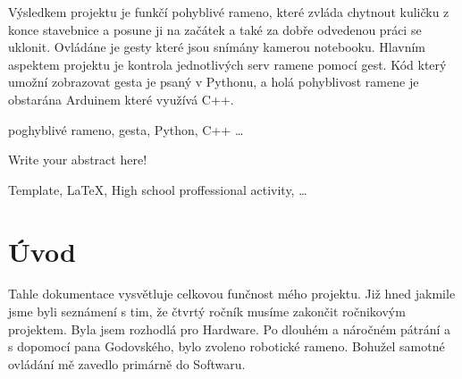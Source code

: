 \documentclass[12pt, a4paper,
twoside,        %
openright
]{report}
\begin{document}
{%

	\noindent 
	Výsledkem projektu je funkčí pohyblivé rameno, které zvláda chytnout kuličku z konce stavebnice a posune ji na začátek a také za dobře odvedenou práci se uklonit. Ovládáne je gesty které jsou snímány kamerou notebooku. Hlavním aspektem projektu je kontrola jednotlivých serv ramene pomocí gest. Kód který umožní zobrazovat  gesta je psaný v Pythonu, a holá pohyblivost ramene je obstarána Arduinem které využívá C++. 
	
	
	\vspace{18pt}
	
	
	\noindent poghyblivé rameno, gesta, Python, C++ \dots 
	
	\vspace{18pt}

	
	\noindent Write your abstract here! \lipsum[1] %
	
	\vspace{18pt}
	
	
	\noindent Template, \LaTeX, High school proffessional activity, \dots 
	
	\clearpage %

	
	\tableofcontents %

	\setcounter{page}{1} %

	\chapter*{Úvod}

	

Tahle dokumentace vysvětluje celkovou funčnost mého projektu. Již hned jakmile jsme byli seznámení s tim, že čtvrtý ročník musíme zakončit ročnikovým projektem. Byla jsem rozhodlá pro Hardware. Po dlouhém a náročném pátrání a s dopomocí pana Godovského, bylo zvoleno robotické rameno. Bohužel samotné ovládání mě zavedlo primárně do Softwaru.

}
\end{document}
